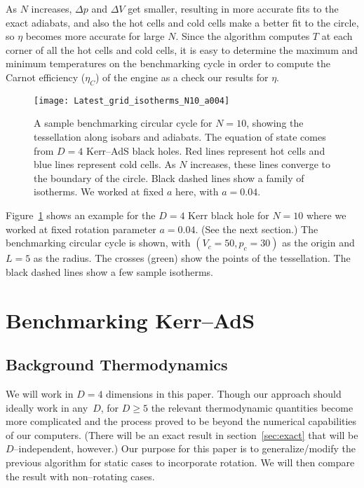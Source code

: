 \documentclass[letterpaper,11pt]{article}
\begin{document}
As $N$ increases, $\Delta p$ and $\Delta V$ get smaller, resulting in more accurate fits to the exact adiabats, and also the hot cells and cold cells make a better fit to the circle, so  $\eta$ becomes more accurate for large $N$. Since the algorithm computes $T$ at each  corner  of  all the hot cells and cold cells, it is easy to determine the maximum and minimum temperatures on  the benchmarking cycle in order to compute the Carnot efficiency ($\eta_{C}$) of the engine as a  check our results for $\eta$.



\begin{figure}[h]
\begin{center}
{\centering
\texttt{[image: Latest\_grid\_isotherms\_N10\_a004]} 
   \caption{\footnotesize  A sample benchmarking circular cycle for $N=10$, showing the tessellation along isobars and adiabats. The equation of state comes from $D=4$ Kerr--AdS black holes. Red lines represent hot cells and blue lines represent cold cells. As $N$ increases, these lines converge to the boundary of the circle. Black dashed lines show a family of isotherms. We worked at fixed $a$ here, with $a=0.04$.}   \label{fig:CCN10}
}
   \end{center}
\end{figure}


Figure~\ref{fig:CCN10} shows an example for the $D=4$ Kerr black hole for $N=10$ where  we worked at fixed rotation parameter $a=0.04$. (See the next section.) The benchmarking circular cycle is shown, with $(V_c=50, p_c=30)$ as the origin and $L=5$ as the radius. The  crosses (green) show the points of the  tessellation. The black dashed lines show a few sample isotherms. 


\section{Benchmarking Kerr--AdS}
\label{sec:kerr}

\subsection{Background Thermodynamics}


We will work in $D=4$ dimensions in this paper. Though our approach should ideally work in any~$D$, for $D\geq5$ the relevant thermodynamic quantities become more complicated and the process proved to be beyond the numerical capabilities of our computers. (There will be an exact result in section~\ref{sec:exact} that will be $D$--independent, however.) Our purpose for this paper is to generalize/modify the previous algorithm for static cases to incorporate rotation. We will then compare the result with  non--rotating cases. 
\end{document}
